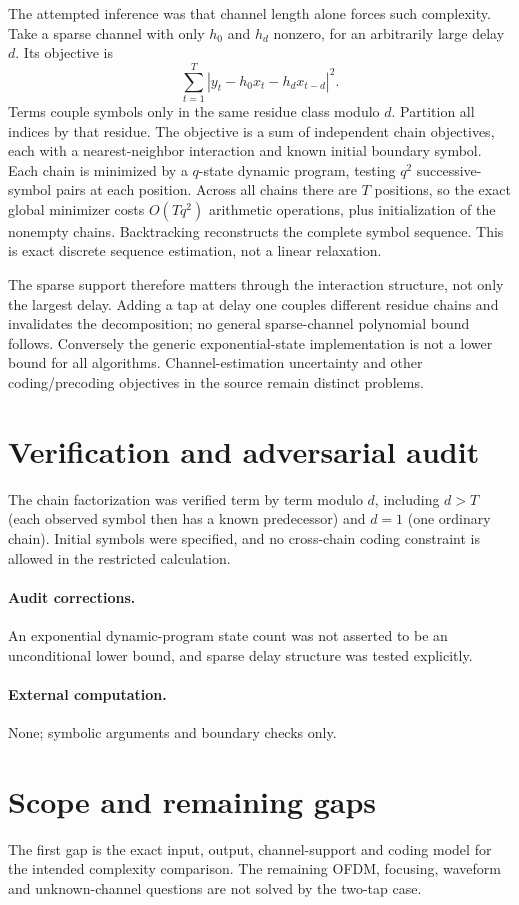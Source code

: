 \documentclass[11pt]{article}
\begin{document}
The attempted inference was that channel length alone forces such complexity.
Take a sparse channel with only $h_0$ and $h_d$ nonzero, for an arbitrarily large
delay $d$. Its objective is
\[
 \sum_{t=1}^T|y_t-h_0x_t-h_dx_{t-d}|^2.
\]
Terms couple symbols only in the same residue class modulo $d$. Partition all
indices by that residue. The objective is a sum of independent chain objectives,
each with a nearest-neighbor interaction and known initial boundary symbol.
Each chain is minimized by a $q$-state dynamic program, testing $q^2$
successive-symbol pairs at each position. Across all chains there are $T$
positions, so the exact global minimizer costs $O(Tq^2)$ arithmetic operations,
plus initialization of the nonempty chains. Backtracking reconstructs the
complete symbol sequence. This is exact discrete sequence estimation, not a
linear relaxation.

The sparse support therefore matters through the interaction structure, not
only the largest delay. Adding a tap at delay one couples different residue
chains and invalidates the decomposition; no general sparse-channel polynomial
bound follows. Conversely the generic exponential-state implementation is not
a lower bound for all algorithms. Channel-estimation uncertainty and other
coding/precoding objectives in the source remain distinct problems.
\section{Verification and adversarial audit}
The chain factorization was verified term by term modulo $d$, including
$d>T$ (each observed symbol then has a known predecessor) and $d=1$ (one
ordinary chain). Initial symbols were specified, and no cross-chain coding
constraint is allowed in the restricted calculation.
\paragraph{Audit corrections.} An exponential dynamic-program state count was not asserted to be an unconditional lower bound, and sparse delay structure was tested explicitly.
\paragraph{External computation.} None; symbolic arguments and boundary checks only.
\section{Scope and remaining gaps}
The first gap is the exact input, output, channel-support and coding model
for the intended complexity comparison. The remaining OFDM, focusing,
waveform and unknown-channel questions are not solved by the two-tap case.
\end{document}
